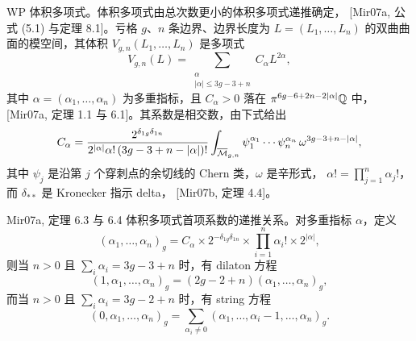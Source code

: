 \begin{thmplain}
WP 体积多项式。体积多项式由总次数更小的体积多项式递推确定，
[Mir07a, 公式 (5.1) 与定理 8.1]。亏格 $g$、$n$ 条边界、边界长度为
$L=(L_1,\dots,L_n)$ 的双曲曲面的模空间，其体积 $V_{g,n}(L_1,\dots,L_n)$ 是多项式
\[
V_{g,n}(L)=\sum_{\substack{\alpha\\ |\alpha|\le 3g-3+n}} C_\alpha L^{2\alpha},
\]
其中 $\alpha=(\alpha_1,\dots,\alpha_n)$ 为多重指标，且 $C_\alpha>0$ 落在
$\pi^{6g-6+2n-2|\alpha|}\mathbb{Q}$ 中，[Mir07a, 定理 1.1 与 6.1]。其系数是相交数，由下式给出
\[
C_\alpha=\frac{2^{\delta_{1g}\delta_{1n}}}{2^{|\alpha|}\alpha!\,(3g-3+n-|\alpha|)!}
\int_{\overline{\mathcal{M}}_{g,n}}\psi_1^{\alpha_1}\cdots\psi_n^{\alpha_n}\,\omega^{3g-3+n-|\alpha|},
\]
其中 $\psi_j$ 是沿第 $j$ 个穿刺点的余切线的 Chern 类，$\omega$ 是辛形式，
$\alpha!=\prod_{j=1}^n\alpha_j!$，而 $\delta_{**}$ 是 Kronecker 指示 delta，
[Mir07b, 定理 4.4]。
\end{thmplain}

%

\begin{thmplaincite}{Mir07a, 定理 6.3 与 6.4}
体积多项式首项系数的递推关系。对多重指标 $\alpha$，定义
\[
(\alpha_1,\dots,\alpha_n)_g=C_\alpha\times 2^{-\delta_{1g}\delta_{1n}}
\times\prod_{i=1}^n\alpha_i!\times 2^{|\alpha|},
\]
则当 $n>0$ 且 $\sum_i\alpha_i=3g-3+n$ 时，有 dilaton 方程
\[
(1,\alpha_1,\dots,\alpha_n)_g=(2g-2+n)(\alpha_1,\dots,\alpha_n)_g,
\]
而当 $n>0$ 且 $\sum_i\alpha_i=3g-2+n$ 时，有 string 方程
\[
(0,\alpha_1,\dots,\alpha_n)_g=\sum_{\alpha_i\neq 0}(\alpha_1,\dots,\alpha_i-1,\dots,\alpha_n)_g.
\]
\end{thmplaincite}

